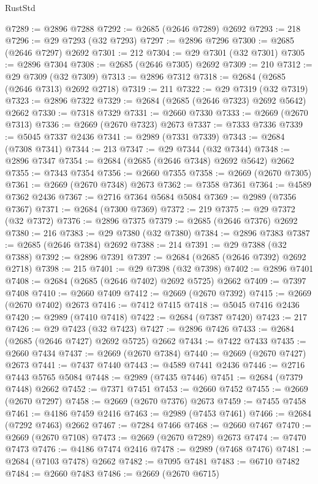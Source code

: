 \begin{lexlean}{RustStd}
\begin{coremodule}
@7289 := @2896 @7288
@7292 := @2685 (@2646 @7289) @2692
@7293 := 218
@7296 := @29 @7293 (@32 @7293)
@7297 := @2896 @7296
@7300 := @2685 (@2646 @7297) @2692
@7301 := 212
@7304 := @29 @7301 (@32 @7301)
@7305 := @2896 @7304
@7308 := @2685 (@2646 @7305) @2692
@7309 := 210
@7312 := @29 @7309 (@32 @7309)
@7313 := @2896 @7312
@7318 := @2684 (@2685 (@2646 @7313) @2692 @2718)
@7319 := 211
@7322 := @29 @7319 (@32 @7319)
@7323 := @2896 @7322
@7329 := @2684 (@2685 (@2646 @7323) @2692 @5642) @2662
@7330 := @7318 @7329
@7331 := @2660 @7330
@7333 := @2669 (@2670 @7313)
@7336 := @2669 (@2670 @7323) @2673
@7337 := @7333 @7336
@7339 := @5045 @7337 @2436
@7341 := @2989 (@7331 @7339)
@7343 := @2684 (@7308 @7341)
@7344 := 213
@7347 := @29 @7344 (@32 @7344)
@7348 := @2896 @7347
@7354 := @2684 (@2685 (@2646 @7348) @2692 @5642) @2662
@7355 := @7343 @7354
@7356 := @2660 @7355
@7358 := @2669 (@2670 @7305)
@7361 := @2669 (@2670 @7348) @2673
@7362 := @7358 @7361
@7364 := @4589 @7362 @2436
@7367 := @2716 @7364 @5684 @5084
@7369 := @2989 (@7356 @7367)
@7371 := @2684 (@7300 @7369)
@7372 := 219
@7375 := @29 @7372 (@32 @7372)
@7376 := @2896 @7375
@7379 := @2685 (@2646 @7376) @2692
@7380 := 216
@7383 := @29 @7380 (@32 @7380)
@7384 := @2896 @7383
@7387 := @2685 (@2646 @7384) @2692
@7388 := 214
@7391 := @29 @7388 (@32 @7388)
@7392 := @2896 @7391
@7397 := @2684 (@2685 (@2646 @7392) @2692 @2718)
@7398 := 215
@7401 := @29 @7398 (@32 @7398)
@7402 := @2896 @7401
@7408 := @2684 (@2685 (@2646 @7402) @2692 @5725) @2662
@7409 := @7397 @7408
@7410 := @2660 @7409
@7412 := @2669 (@2670 @7392)
@7415 := @2669 (@2670 @7402) @2673
@7416 := @7412 @7415
@7418 := @5045 @7416 @2436
@7420 := @2989 (@7410 @7418)
@7422 := @2684 (@7387 @7420)
@7423 := 217
@7426 := @29 @7423 (@32 @7423)
@7427 := @2896 @7426
@7433 := @2684 (@2685 (@2646 @7427) @2692 @5725) @2662
@7434 := @7422 @7433
@7435 := @2660 @7434
@7437 := @2669 (@2670 @7384)
@7440 := @2669 (@2670 @7427) @2673
@7441 := @7437 @7440
@7443 := @4589 @7441 @2436
@7446 := @2716 @7443 @5765 @5084
@7448 := @2989 (@7435 @7446)
@7451 := @2684 (@7379 @7448) @2662
@7452 := @7371 @7451
@7453 := @2660 @7452
@7455 := @2669 (@2670 @7297)
@7458 := @2669 (@2670 @7376) @2673
@7459 := @7455 @7458
@7461 := @4186 @7459 @2416
@7463 := @2989 (@7453 @7461)
@7466 := @2684 (@7292 @7463) @2662
@7467 := @7284 @7466
@7468 := @2660 @7467
@7470 := @2669 (@2670 @7108)
@7473 := @2669 (@2670 @7289) @2673
@7474 := @7470 @7473
@7476 := @4186 @7474 @2416
@7478 := @2989 (@7468 @7476)
@7481 := @2684 (@7103 @7478) @2662
@7482 := @7095 @7481
@7483 := @6710 @7482
@7484 := @2660 @7483
@7486 := @2669 (@2670 @6715)

\end{coremodule}
\end{lexlean}
